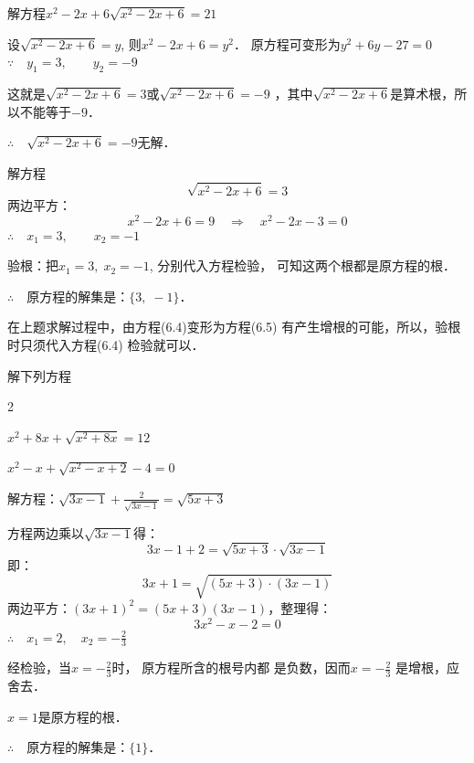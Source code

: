 \begin{example}
解方程$x^2-2x+6\sqrt{x^2-2x+6}=21$
\end{example}


\begin{solution}
    设$\sqrt{x^2-2x+6}=y$, 则$x^2-2x+6=y^2$．
原方程可变形为$y^2+6y-27=0$
$\because\quad y_1=3,\qquad y_2=-9$

这就是$\sqrt{x^2-2x+6}=3$或$\sqrt{x^2-2x+6}=-9$
，其中$\sqrt{x^2-2x+6}$是算术根，所以不能等于$-9$．

$\therefore\quad \sqrt{x^2-2x+6}=-9$无解．

解方程
\begin{equation}
    \sqrt{x^2-2x+6}=3
\end{equation}
两边平方：
\begin{equation}
    x^2-2x+6=9 \quad \Rightarrow\quad  x^2-2x-3=0
\end{equation}
$\therefore\quad x_1=3,\qquad x_2=-1$

验根：把$x_1=3,\; x_2=-1$, 分别代入方程检验，
可知这两个根都是原方程的根．

$\therefore\quad $原方程的解集是：$\{3,\;-1\}$．
\end{solution}

在上题求解过程中，由方程(6.4)变形为方程(6.5)
有产生增根的可能，所以，验根时只须代入方程(6.4)
检验就可以．

\begin{ex}
    解下列方程
    \begin{enumerate}
        \begin{multicols}{2}
        \item $x^2+8x+\sqrt{x^2+8x}=12$
        \item $x^2-x+\sqrt{x^2-x+2}-4=0$
        \end{multicols}
    \end{enumerate}
\end{ex}

\begin{example}
    解方程：$\sqrt{3x-1}+\frac{2}{\sqrt{3x-1}}=\sqrt{5x+3}$
\end{example}

\begin{solution}
    方程两边乘以$\sqrt{3x-1}$得：
\[3x-1+2=\sqrt{5x+3}\cdot \sqrt{3x-1} \]
即：
\[3x+1=\sqrt{(5x+3)\cdot (3x-1)}\]
两边平方：$(3x+1)^2=(5x+3)  (3x-1)$，整理得：
\[3x^2-x-2=0 \]
$\therefore\quad x_1=2,\quad x_2=-\frac{2}{3}$

经检验，当$x=-\frac{2}{3}$时，
原方程所含的根号内都
是负数，因而$x=-\frac{2}{3}$
是增根，应舍去．

$x=1$是原方程的根．

$\therefore\quad $原方程的解集是：$\{1\}$．
\end{solution}

